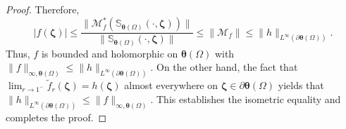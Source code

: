 \documentclass[12pt,reqno]{amsart}
\theoremstyle{remark}
\theoremstyle{definition}
\newcommand{\sgn}{{\rm sgn\,}}
\def \z{\boldsymbol{z}}
\def \q{\boldsymbol{q}}
\begin{document}
\begin{proof}
    Therefore, $$|f(\boldsymbol \zeta)| \leq \frac{\|\mathcal{M}_f^*(\mathbb S_{\boldsymbol \theta(\Omega)}(\cdot, \boldsymbol{\zeta}))\|}{\|\mathbb S_{\boldsymbol \theta(\Omega)}(\cdot, \boldsymbol{\zeta})\|}\leq \|\mathcal{M}_f\| \leq \|h\|_{L^\infty(\partial\boldsymbol \theta(\Omega))}.$$ 
    Thus, $f$ is bounded and holomorphic on $\boldsymbol \theta (\Omega)$ with $\|f\|_{\infty, \boldsymbol \theta(\Omega)} \leq \|h\|_{L^\infty(\partial\boldsymbol \theta(\Omega))}.$
    On the other hand, the fact that $\lim_{r \to 1^-} \tilde{f}_r(\boldsymbol \zeta)=h(\boldsymbol \zeta)$  almost everywhere on $\boldsymbol \zeta \in \partial\boldsymbol \theta(\Omega)$ yields that $\|h\|_{L^\infty(\partial\boldsymbol \theta(\Omega))} \leq \|f\|_{\infty, \boldsymbol \theta(\Omega)}.$
    This establishes the isometric equality and completes the proof.
    \end{proof}








\end{document}
